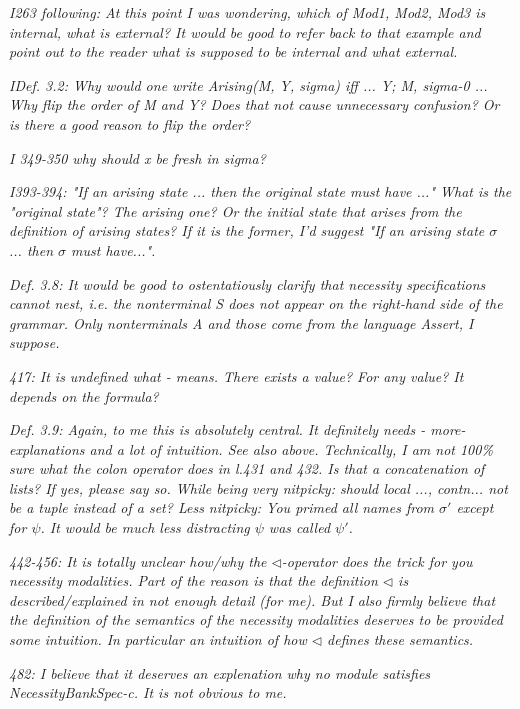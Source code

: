 \documentclass[11pt]{amsart}
\newcommand{\rev}[1]{\emph #1}
\begin{document}
{\rev {{I263 following: At this point I was wondering, which of Mod1, Mod2, Mod3 is internal, what is external? It would be good to refer back to that example and point out to the reader what is supposed to be internal and what external. }}}

 {\rev {{IDef. 3.2: Why would one write Arising(M, Y, sigma) iff ... Y; M, sigma-0 ... Why flip the order of M and Y? Does that not cause unnecessary confusion? Or is there a good reason to flip the order? }}}

{\rev {{I 349-350 why should x be fresh in sigma? }}}

{\rev {{I393-394: "If an arising state ... then the original state must have ..." What is the "original state"? The arising one? Or the initial state that arises from the definition of arising states? If it is the former, I'd suggest "If an arising state $\sigma$ ... then $\sigma$ must have...". }}}

{\rev {{Def. 3.8: It would be good to ostentatiously clarify that necessity specifications cannot nest, i.e. the nonterminal S does not appear on the right-hand side of the grammar. Only nonterminals A and those come from the language Assert, I suppose. }}}

{\rev {{417: It is undefined what  - means. There exists a value? For any value? It depends on the formula? }}}

{\rev {{ Def. 3.9: Again, to me this is absolutely central. It definitely needs - more- explanations and a lot of intuition. See also above. Technically, I am not 100\% sure what the colon operator does in l.431 and 432. Is that a concatenation of lists? If yes, please say so. While being very nitpicky: should {local ..., contn...} not be a tuple instead of a set? Less nitpicky: You primed all names from $\sigma'$ except for $\psi$. It would be much less distracting $\psi$ was called $\psi'$. }}}

{\rev {{442-456: It is totally unclear how/why the $\triangleleft$-operator does the trick for you necessity modalities. Part of the reason is that the definition $\triangleleft$ is described/explained in not enough detail (for me). But I also firmly believe that the definition of the semantics of the necessity modalities deserves to be provided some intuition. In particular an intuition of how $ \triangleleft$ defines these semantics. }}}

{\rev {{482: I believe that it deserves an explenation why no module satisfies NecessityBankSpec-c. It is not obvious to me. }}}
\end{document}
